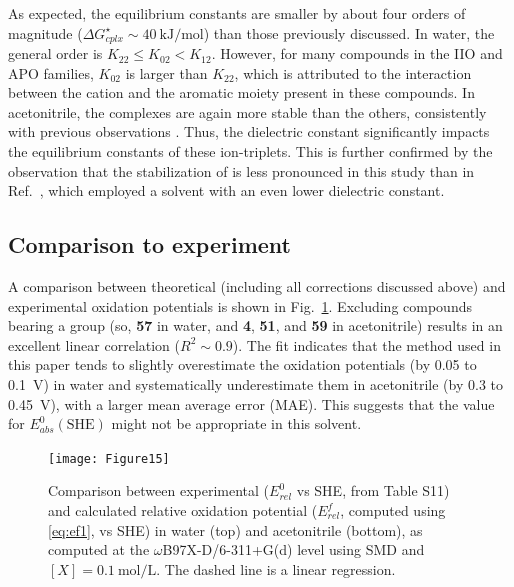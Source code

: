 \documentclass[review,preprint]{elsarticle}
\begin{document}
As expected, the equilibrium constants are smaller by about four orders of magnitude ($\Delta G^\star_{cplx} \sim \SI{40}{\kilo\joule\per\mole}$) than those previously discussed. In water, the general order is $K_{22} \leq K_{02} < K_{12}$. However, for many compounds in the IIO and APO families, $K_{02}$ is larger than $K_{22}$, which is attributed to the interaction between the  cation and the aromatic moiety present in these compounds. In acetonitrile, the  complexes are again more stable than the others, consistently with previous observations \cite{wylieImprovedPerformanceAllOrganic2019a}. Thus, the dielectric constant significantly impacts the equilibrium constants of these ion-triplets. This is further confirmed by the observation that the stabilization of  is less pronounced in this study than in Ref.~, which employed a solvent with an even lower dielectric constant.


\clearpage
\subsection{Comparison to experiment} \label{sec:exp}

A comparison between theoretical (including all corrections discussed above) and experimental oxidation potentials is shown in Fig.~\ref{fig:expvstheo}. Excluding compounds bearing a  group (so,  \textbf{57} in water, and \textbf{4}, \textbf{51}, and \textbf{59} in acetonitrile) results in an excellent linear correlation ($R^2 \sim 0.9$). The fit indicates that the method used in this paper tends to slightly overestimate the oxidation potentials (by 0.05 to \SI{0.1}{\volt}) in water and systematically underestimate them in acetonitrile (by 0.3 to \SI{0.45}{\volt}), with a larger mean average error (MAE). This suggests that the value for $E^0_{abs}(\text{SHE})$ might not be appropriate in this solvent. 

\begin{figure}[!h]
	\centering
	\texttt{[image: Figure15]}
	\caption{Comparison between experimental ($E^0_{rel} $ vs SHE, from Table S11) and  calculated relative oxidation potential ($E^f_{rel}$, computed using \eqref{eq:ef1}, vs SHE) in water (top) and acetonitrile (bottom), as computed at the $\omega$B97X-D/6-311+G(d) level using SMD and $[X]=\SI{0.1}{\mole\per\liter}$.  The dashed line is a linear regression.}
	\label{fig:expvstheo}
\end{figure}
\end{document}
